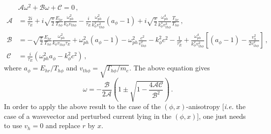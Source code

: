 \documentclass[aps,showpacs,superscriptaddress]{revtex4}
\begin{document}
\begin{align}
&\mathcal{A}\omega^2 +\mathcal{B}\omega +\mathcal{C} = 0\, , \label{eq:dispepoloidal} \\
\mathcal{A}& =\frac{2i}{\tau_E} + i\sqrt{\frac{\pi}{2}}\frac{E_{hr} }{T_{h\phi}}\frac{\omega_{ph}^2}{k_\phi v_{th\phi}} -\frac{i}{\tau_E}\frac{\omega_{ph}^2}{k_\phi^2 v_{th\phi}^2}(a_\phi-1) 
+i\sqrt{\frac{\pi}{2}}\frac{\omega_{ph}^4}{k_\phi^3 v_{th\phi}^3} \frac{T_{hr} }{T_{h\phi}} \label{eq:a} \, , \\
\mathcal{B} & =   - \sqrt{\frac{\pi}{2}}\frac{E_{hr} }{T_{h\phi}}\frac{\omega_{ph}^2}{k_\phi v_{th\phi} \tau_E}
+\omega_{ph}^2(a_\phi-1)-\omega_{ph}^2 \frac{c^2}{v_{th\phi}^2} -k_\phi^2 c^2 -\frac{1}{\tau_E^2 } 
 + \frac{\omega_{ph}^4}{k_\phi^2 v_{th\phi}^2}\left[(a_\phi-1)- \frac{v_h^2}{2v_{th\phi}^2} \right]  \, , \label{eq:b} \\
\mathcal{C} & =\frac{i}{\tau_E}(\omega_{ph}^2 a_\phi -k_\phi^2c^2 )\label{eq:c}\, , 
\end{align}
where $a_\phi = E_{hr}/T_{h\phi}$ and $v_{th\phi} = \sqrt{T_{h\phi}/m_e}$. 
The above equation gives
\begin{equation}
\omega  = -\frac{\mathcal{B}}{2\mathcal{A}}\left(1\pm \sqrt{1-\frac{4\mathcal{A}\mathcal{C}}{\mathcal{B}^2}} \right)
\label{eq:dispesol}\, .
\end{equation}
In order to apply the above result to the case of the $(\phi,x)$-anisotropy [\emph{i.e.} the case of a wavevector and perturbed current lying in the $(\phi,x)$], one just needs to use $v_h = 0$ and replace $r$ by $x$.
\end{document}
